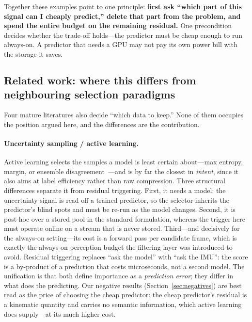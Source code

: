 \documentclass[12pt,a4paper]{article}
\begin{document}
Together these examples point to one principle: \textbf{first ask ``which part of this signal can I cheaply predict,'' delete that part from the problem, and spend the entire budget on the remaining residual.} One precondition decides whether the trade-off holds---the predictor must be cheap enough to run always-on. A predictor that needs a GPU may not pay its own power bill with the storage it saves.

\subsection{Related work: where this differs from neighbouring selection paradigms}
\label{sec:related}

Four mature literatures also decide ``which data to keep.'' None of them occupies the position argued here, and the differences are the contribution.

\paragraph{Uncertainty sampling / active learning.}
Active learning selects the samples a model is least certain about---max entropy, margin, or ensemble disagreement~\cite{settles2012}---and is by far the closest in \emph{intent}, since it also aims at label efficiency rather than raw compression. Three structural differences separate it from residual triggering. First, it needs a model: the uncertainty signal is read off a trained predictor, so the selector inherits the predictor's blind spots and must be re-run as the model changes. Second, it is post-hoc over a stored pool in the standard formulation, whereas the trigger here must operate online on a stream that is never stored. Third---and decisively for the always-on setting---its cost is a forward pass per candidate frame, which is exactly the always-on perception budget the filtering layer was introduced to avoid. Residual triggering replaces ``ask the model'' with ``ask the IMU'': the score is a by-product of a prediction that costs microseconds, not a second model. The unification is that both define importance as a \emph{prediction error}; they differ in what does the predicting. Our negative results (Section~\ref{sec:negatives}) are best read as the price of choosing the cheap predictor: the cheap predictor's residual is a kinematic quantity and carries no semantic information, which active learning does supply---at its much higher cost.
\end{document}
